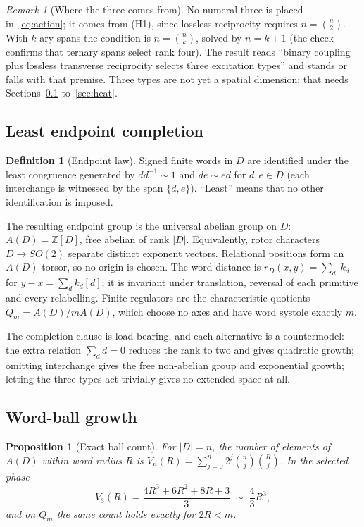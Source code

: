 \documentclass[11pt]{article}
\newtheorem{proposition}[theorem]{Proposition}
\theoremstyle{definition}
\newtheorem{definition}[theorem]{Definition}
\theoremstyle{remark}
\newtheorem{remark}[theorem]{Remark}
\newcommand{\Z}{\mathbb{Z}}
\begin{document}
\begin{remark}[Where the three comes from]
\label{rem:three}
No numeral three is placed in~\eqref{eq:action}; it comes from (H1), since lossless
reciprocity requires $n=\binom n2$. With $k$-ary spans the condition is $n=\binom nk$,
solved by $n=k+1$ (the check confirms that ternary spans select rank four). The result
reads ``binary coupling plus lossless transverse reciprocity selects three excitation
types'' and stands or falls with that premise. Three types are not yet a spatial
dimension; that needs Sections~\ref{sec:endpoint} to~\ref{sec:heat}.
\end{remark}

\subsection{Least endpoint completion}
\label{sec:endpoint}

\begin{definition}[Endpoint law]
Signed finite words in $D$ are identified under the least congruence generated by
$dd^{-1}\sim1$ and $de\sim ed$ for $d,e\in D$ (each interchange is witnessed by the span
$\{d,e\}$). ``Least'' means that no other identification is imposed.
\end{definition}

The resulting endpoint group is the universal abelian group on $D$: $A(D)=\Z[D]$, free
abelian of rank $|D|$. Equivalently, rotor characters $D\to SO(2)$ separate distinct
exponent vectors. Relational positions form an $A(D)$-torsor, so no origin is chosen.
The word distance is $r_D(x,y)=\sum_d|k_d|$ for $y-x=\sum_dk_d[d]$; it is invariant
under translation, reversal of each primitive and every relabelling. Finite regulators
are the characteristic quotients $Q_m=A(D)/mA(D)$, which choose no axes and have word
systole exactly $m$.

The completion clause is load bearing, and each alternative is a countermodel:
the extra relation $\sum_{d}d=0$ reduces the rank to two and gives quadratic growth;
omitting interchange gives the free non-abelian group and exponential growth; letting the
three types act trivially gives no extended space at all.

\subsection{Word-ball growth}
\label{sec:volume}

\begin{proposition}[Exact ball count]
\label{prop:volume}
For $|D|=n$, the number of elements of $A(D)$ within word radius $R$ is
$V_n(R)=\sum_{j=0}^{n}2^j\binom nj\binom Rj$. In the selected phase
\begin{equation}
V_3(R)=\frac{4R^3+6R^2+8R+3}{3}\;\sim\;\frac43R^3 ,
\label{eq:v3}
\end{equation}
and on $Q_m$ the same count holds exactly for $2R<m$.
\end{proposition}
\end{document}

